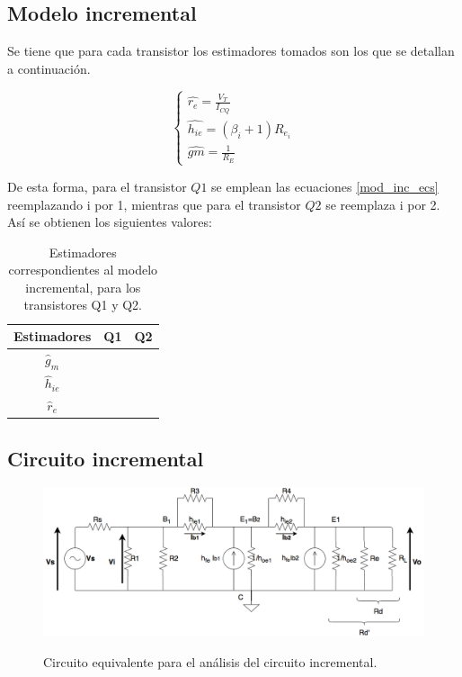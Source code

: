 

	\subsection{Modelo incremental}
	
	Se tiene que para cada transistor los estimadores tomados son los que se detallan a continuación.


		\begin{equation}
			\begin{cases}
			\widehat{r_{e}}=\frac{V_{T}}{I_{CQ}}\\
			\widehat{h_{ie}}=(\beta_{i}+1)R_{e_{i}}\\	
			\widehat{gm}=\frac{1}{R_{E}}
			\end{cases}
			\label{mod_inc_ecs}
		\end{equation}
	
	De esta forma, para el transistor $Q1$ se emplean las ecuaciones \ref{mod_inc_ecs} reemplazando i por 1, mientras que para el transistor $Q2$ se reemplaza i por 2. Así se obtienen los siguientes valores:
	
	\begin{table}[h!]
		\centering
		\begin{tabular}{c c c}%
			\bfseries Estimadores & Q1 & Q2 \\ \hline
			$\widehat{g}_m$ &  & \\
			$\widehat{h}_{ie}$ &  & \\
			$\widehat{r}_{e}$&  & \\
			\hline
		\end{tabular}
		\caption{Estimadores correspondientes al modelo incremental, para los transistores Q1 y Q2.}
		\label{avolf}
	\end{table}
	
	\subsection{Circuito incremental}
	
		
		\begin{figure}[H]
			\centering
			\includegraphics[scale=0.4]{./Imagenes/circ_incremental.png} \\
			\caption{Circuito equivalente para el an\'alisis del circuito incremental.}
			\label{circ_incremental}
		\end{figure}

